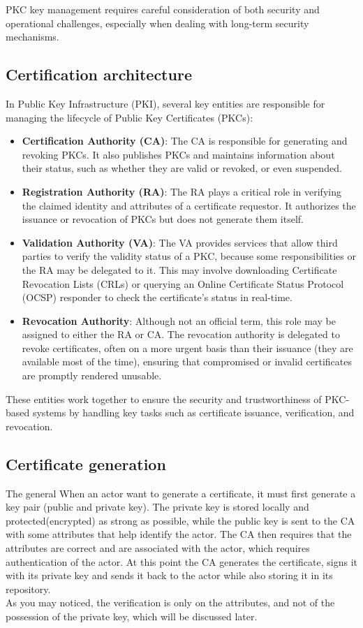 PKC key management requires careful consideration of both security and
operational challenges, especially when dealing with long-term
security mechanisms.

\subsection{Certification architecture}

In Public Key Infrastructure (PKI), several key entities are
responsible for managing the lifecycle of Public Key Certificates
(PKCs):

\begin{itemize}
  \item \textbf{Certification Authority (CA)}: The CA is responsible
    for generating and revoking PKCs. It also publishes PKCs and
    maintains information about their status, such as whether they
    are valid or revoked, or even suspended.
  \item \textbf{Registration Authority (RA)}: The RA plays a
    critical role in verifying the claimed identity and attributes
    of a certificate requestor. It authorizes the issuance or
    revocation of PKCs but does not generate them itself.
  \item \textbf{Validation Authority (VA)}: The VA provides services
    that allow third parties to verify the validity status of a PKC,
    because some responsibilities or the RA may be delegated to it.
    This may involve downloading Certificate Revocation Lists (CRLs)
    or querying an Online Certificate Status Protocol (OCSP)
    responder to check the certificate's status in real-time.
  \item \textbf{Revocation Authority}: Although not an official
    term, this role may be assigned to either the RA or CA. The
    revocation authority is delegated to revoke certificates, often
    on a more urgent basis than their issuance (they are available
    most of the time), ensuring that compromised or invalid
    certificates are promptly rendered unusable.
\end{itemize}

These entities work together to ensure the security and
trustworthiness of PKC-based systems by handling key tasks such as
certificate issuance, verification, and revocation.

\subsection{Certificate generation}
The general
When an actor want to generate a certificate, it must first generate a 
key pair (public and private key). The private key is stored locally
and protected(encrypted) as strong as possible, while the public key 
is sent to the CA with some attributes that help identify the actor.
The CA then requires that the attributes are correct and are
associated with the actor, which requires authentication of the actor.
At this point the CA generates the certificate, signs it with its 
private key and sends it back to the actor while also storing it in 
its repository.\\
As you may noticed, the verification is only on the attributes, and
not of the possession of the private key, which will be discussed
later.


